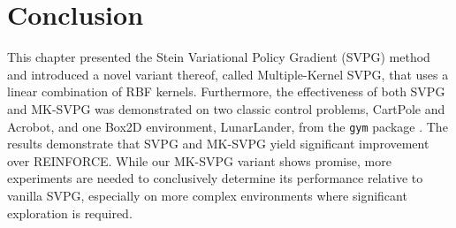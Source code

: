 %

\newpage

\section{Conclusion}

This chapter presented the Stein Variational Policy Gradient (SVPG) \citep{liu_svpg} method and introduced a novel variant thereof, called Multiple-Kernel SVPG, that uses a linear combination of RBF kernels. Furthermore, the effectiveness of both SVPG and MK-SVPG was demonstrated on two classic control problems, CartPole and Acrobot, and one Box2D environment, LunarLander, from the \texttt{gym} package \citep{openai_gym}. The results demonstrate that SVPG and MK-SVPG yield significant improvement over REINFORCE. While our MK-SVPG variant shows promise, more experiments are needed to conclusively determine its performance relative to vanilla SVPG, especially on more complex environments where significant exploration is required.














